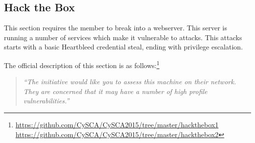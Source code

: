 \documentclass[twoside,a4paper,11pt]{report}
\begin{document}
			
		\subsection{Hack the Box}
			This section requires the member to break into a webserver. 
			This server is running a number of services which make it vulnerable to attacks. 
			This attacks starts with a basic Heartbleed credential steal, ending with privilege escalation. 

			The official description of this section is as follows:\footnote{\url{https://github.com/CySCA/CySCA2015/tree/master/hackthebox1}\\\qquad\url{https://github.com/CySCA/CySCA2015/tree/master/hackthebox2}} 
			\begin{quote}
				\textit{``The initiative would like you to assess this machine on their network. They are concerned that it may have a number of high profile vulnerabilities.''}
			\end{quote}
\end{document}
